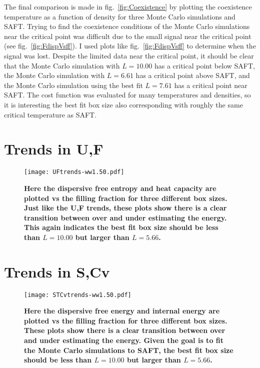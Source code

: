 The final comparison is made in fig.~\ref{fig:Coexistence} by plotting the coexistence temperature as a function of density for three Monte Carlo simulations and SAFT. Trying to find the coexistence conditions of the Monte Carlo simulations near the critical point was difficult due to the small signal near the critical point (see fig.~\ref{fig:FdispVsff}). I used plots like fig.~\ref{fig:FdispVsff} to determine when the signal was lost. Despite the limited data near the critical point, it should be clear that the Monte Carlo simulation with $L=10.00$ has a critical point below SAFT, the Monte Carlo simulation with $L=6.61$ has a critical point above SAFT, and the Monte Carlo simulation using the best fit $L=7.61$ has a critical point near SAFT. The cost function was evaluated for many temperatures and densities, so it is interesting the best fit box size also corresponding with roughly the same critical temperature as SAFT.


\pagebreak

\section{Trends in U,F}
\begin{figure}[h]
\vspace*{-40mm}
\hspace*{-6mm}
	\centering
	\texttt{[image: UFtrends-ww1.50.pdf]}
	\caption{
	\scriptsize\textbf{Here the dispersive free entropy and heat capacity are plotted vs the filling fraction for three different box sizes. Just like the U,F trends, these plots show there is a clear transition between over and under estimating the energy. This again indicates the best fit box size should be less than $L=10.00$ but larger than $L=5.66$.
	}}
	\label{fig:UFtrends}
\end{figure}


\pagebreak
\section{Trends in S,Cv}
\begin{figure}[h]
\vspace*{-40mm}
\hspace*{-6mm}
	\centering
	\texttt{[image: STCvtrends-ww1.50.pdf]}
	\caption{\scriptsize\textbf{Here the dispersive free energy and internal energy are plotted vs the filling fraction for three different box sizes. These plots show there is a clear transition between over and under estimating the energy. Given the goal is to fit the Monte Carlo simulations to SAFT, the best fit box size should be less than $L=10.00$ but larger than $L=5.66$.
	}}
	\label{fig:STCvtrends}
\end{figure}


